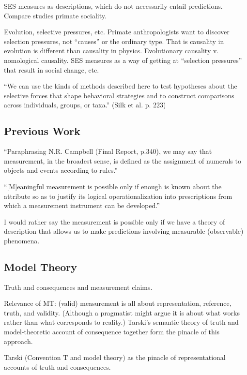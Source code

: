 \documentclass[11pt,twoside]{article}
\begin{document}
SES measures as descriptions, which do not necessarily entail
predictions.  Compare studies primate sociality.

Evolution, selective pressures, etc.  Primate anthropologists want to
discover selection pressures, not ``causes'' or the ordinary type.
That is causality in evolution is different than causality in physics.
Evolutionary causality v. nomological causality.  SES measures as a
way of getting at ``selection pressures'' that result in social
change, etc.

``We can use the kinds of methods described here to test hypotheses
about the selective forces that shape behavioral strategies and to
construct comparisons across individuals, groups, or taxa.'' (Silk
et al. p. 223)

\subsection{Previous Work}

``Paraphrasing N.R. Campbell (Final Report, p.340), we may say that
measurement, in the broadest sense, is defined as the assignment of
numerals to objects and events according to rules.''
\parencite[677]{stevens_theory_1946}


``[M]eaningful measurement is possible only if enough is known about
the attribute so as to justify its logical operationalization into
prescriptions from which a measurement instrument can be developed.''
\parencite[787]{sijtsma_psychological_2012}

I would rather say the measurement is possible only if we have a
theory of description that allows us to make predictions involving
measurable (observable) phenomena.

\subsection{Model Theory}

Truth and consequences and measurement claims.

Relevance of MT: (valid) measurement is all about representation,
reference, truth, and validity.  (Although a pragmatist might argue it
is about what works rather than what corresponds to reality.)
Tarski's semantic theory of truth and model-theoretic account of
consequence together form the pinacle of this approach.

Tarski (Convention T and model theory) as the pinacle of
representational accounts of truth and consequences.
\end{document}
